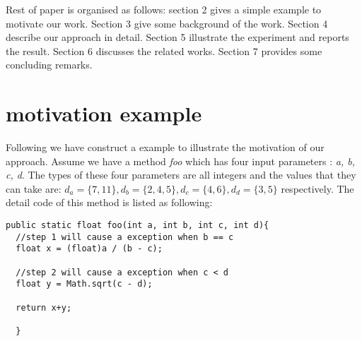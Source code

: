 \documentclass{sig-alternate}
\begin{document}



Rest of paper is organised as follows:
section 2 gives a simple example to motivate our work. Section 3 give some background of the work. Section 4 describe our approach in detail. Section 5 illustrate the experiment and reports the result. Section 6 discusses the related works. Section 7 provides some concluding remarks.

\section{motivation example}

Following we have construct a example to illustrate the motivation of our approach. Assume we have a method \emph{foo} which has four input parameters : \emph{a, b, c, d}. The types of these four parameters are all integers and the values that they can take are: $d_{a} = \{7, 11\}, d_{b} = \{2, 4, 5\}, d_{c} = \{4, 6\}, d_{d} = \{3, 5\}$ respectively.  The detail code of this method is listed as following:

\begin{verbatim}
public static float foo(int a, int b, int c, int d){
  //step 1 will cause a exception when b == c
  float x = (float)a / (b - c);

  //step 2 will cause a exception when c < d
  float y = Math.sqrt(c - d);

  return x+y;

  }
\end{verbatim}
\end{document}
